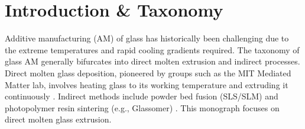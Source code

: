 \section{Introduction \& Taxonomy}
Additive manufacturing (AM) of glass has historically been challenging due to the extreme temperatures and rapid cooling gradients required. The taxonomy of glass AM generally bifurcates into direct molten extrusion and indirect processes. Direct molten glass deposition, pioneered by groups such as the MIT Mediated Matter lab, involves heating glass to its working temperature and extruding it continuously \cite{klein2015additive, oxman2015glass}. Indirect methods include powder bed fusion (SLS/SLM) \cite{fateri2014additive} and photopolymer resin sintering (e.g., Glassomer) \cite{kotz2017three}. This monograph focuses on direct molten glass extrusion.
